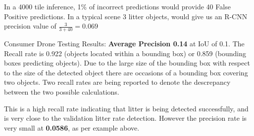 \documentclass{IEEEtran}
\begin{document}
In a 4000 tile inference, 1\% of incorrect predictions would provide 40 False Positive predictions. In a typical scene 3 litter objects, would give us an R-CNN precision value of $\frac{3}{3+40} = 0.069$


Consumer Drone Testing Results: \textbf{Average Precision 0.14} at IoU of 0.1. The Recall rate is 0.922 (objects located within a bounding box) or 0.859 (bounding boxes predicting objects). Due to the large size of the bounding box with respect to the size of the detected object there are occasions of a bounding box covering two objects. Two recall rates are being reported to denote the descrepancy between the two possible calculations.\newline

This is a high recall rate indicating that litter is being detected successfully, and is very close to the validation litter rate detection.  However the precision rate is very small at \textbf{0.0586}, as per example above. 
\end{document}
